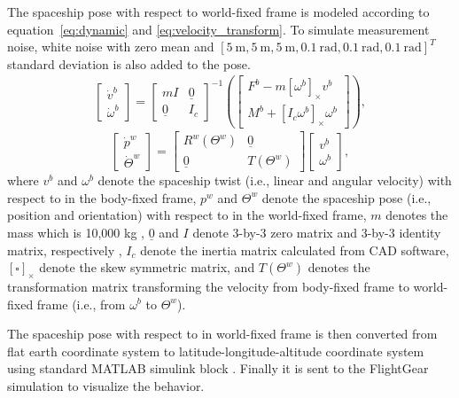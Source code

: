 The spaceship pose with respect to world-fixed frame is modeled according to equation~\ref{eq:dynamic} and \ref{eq:velocity_transform}. To simulate measurement noise, white noise with zero mean and $[5\:\text{m}, 5\:\text{m}, 5\:\text{m}, 0.1\:\text{rad}, 0.1\:\text{rad},0.1\:\text{rad}]^T$standard deviation is also added to the pose.
\begin{align}
\begin{bmatrix} \dot{v}^b \\ \dot{\omega}^b \end{bmatrix} = \begin{bmatrix}mI & \underline{0} \\ \underline{0} & I_c \end{bmatrix}
^{-1} \left( 
\begin{bmatrix} F^b - m \left[ \omega^b \right]_\times v^b \\ M^b + \left[ I_c \omega^b \right]_\times \omega^b \end{bmatrix}
 \right ),
\label{eq:dynamic}
\end{align}
\begin{equation}
\begin{bmatrix} \dot{p}^w \\ \dot{\Theta}^w \end{bmatrix} = \begin{bmatrix}R^w(\Theta^w) & \underline{0} \\ \underline{0} & T(\Theta^w) \end{bmatrix} 
\begin{bmatrix} v^b \\ \omega^b \end{bmatrix},
\label{eq:velocity_transform}
\end{equation}
where $v^b$ and $\omega^b$ denote the spaceship twist (i.e., linear and angular velocity) with respect to in the body-fixed frame, $p^w$ and $\Theta^w$ denote the spaceship pose (i.e., position and orientation) with respect to in the world-fixed frame, $m$ denotes the mass which is 10,000 kg \cite{xwing_wiki}, $\underline{0}$ and $I$ denote 3-by-3 zero matrix and 3-by-3 identity matrix, respectively , $I_c$ denote the inertia matrix calculated from CAD software, $[\square]_\times$ denote the skew symmetric matrix, and $T(\Theta^w)$ denotes the transformation matrix transforming the velocity from body-fixed frame to world-fixed frame (i.e., from $\omega^b$ to $\Theta^w$).  


The spaceship pose with respect to in world-fixed frame is then converted from flat earth coordinate system to latitude-longitude-altitude coordinate system using standard MATLAB simulink block \cite{fe2lla}. Finally it is sent to the FlightGear \cite{flightgear} simulation to visualize the behavior.